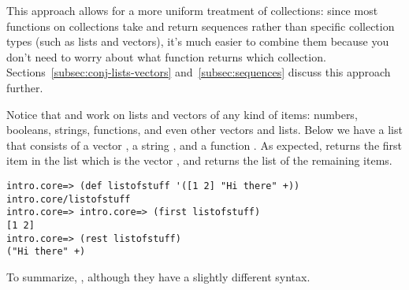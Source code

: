 This approach allows for a more uniform treatment of collections: since most functions on collections take and return sequences rather than specific collection types (such as lists and vectors), it's much easier to combine them because you don't need to worry about what function returns which collection. Sections~\ref{subsec:conj-lists-vectors} and~\ref{subsec:sequences} discuss this approach further. 


Notice that  and  work on lists and vectors of any kind of items: numbers, booleans, strings, functions, and even other vectors and lists. Below we have a list that consists of a vector \clocode{[1 2]}, a string , and a function \clocode{+}. As expected,  returns the first item in the list which is the vector \clocode{[1 2]}, and  returns the list of the remaining items. 
\begin{framed}
\begin{verbatim}
intro.core=> (def listofstuff '([1 2] "Hi there" +))
intro.core/listofstuff
intro.core=> intro.core=> (first listofstuff)
[1 2]
intro.core=> (rest listofstuff)
("Hi there" +)
\end{verbatim}
\end{framed}
To summarize, , although they have a slightly different syntax.  

